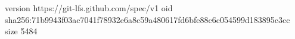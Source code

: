 version https://git-lfs.github.com/spec/v1
oid sha256:71b9943f03ac7041f78932e6a8c59a480617fd6bfe88c6c054599d183895c3cc
size 5484
